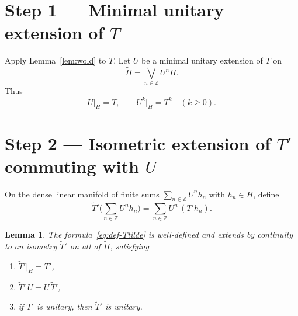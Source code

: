 \documentclass[11pt]{article}
\newtheorem{lemma}[theorem]{Lemma}
\begin{document}
\bigskip
\section*{Step 1 --- Minimal unitary extension of \(T\)}

Apply Lemma~\ref{lem:wold} to \(T\). Let \(U\) be a minimal unitary extension of
\(T\) on
\begin{equation}
\label{eq:Htilde}
\widetilde{H}
=
\bigvee_{n\in\mathbb{Z}}U^n H.
\end{equation}
Thus
\begin{equation}
\label{eq:U-powers}
U\big|_H=T,
\qquad
U^k\big|_H=T^k\quad(k\ge 0).
\end{equation}

\bigskip
\section*{Step 2 --- Isometric extension of \(T'\) commuting with \(U\)}

On the dense linear manifold of finite sums
\(\sum_{n\in\mathbb{Z}}U^n h_n\) with \(h_n\in H\), define
\begin{equation}
\label{eq:def-Ttilde}
\widetilde{T}'\Biggl(\sum_{n\in\mathbb{Z}}U^n h_n\Biggr)
=
\sum_{n\in\mathbb{Z}}U^n\,(T'h_n).
\end{equation}

\begin{lemma}
\label{lem:Ttilde}
The formula~\eqref{eq:def-Ttilde} is well-defined and extends by continuity to an
isometry \(\widetilde{T}'\) on all of \(\widetilde{H}\), satisfying
\begin{enumerate}
\item[\rm(i)] \(\widetilde{T}'\big|_H=T'\),
\item[\rm(ii)] \(\widetilde{T}'\,U=U\,\widetilde{T}'\),
\item[\rm(iii)] if \(T'\) is unitary, then \(\widetilde{T}'\) is unitary.
\end{enumerate}
\end{lemma}
\end{document}
